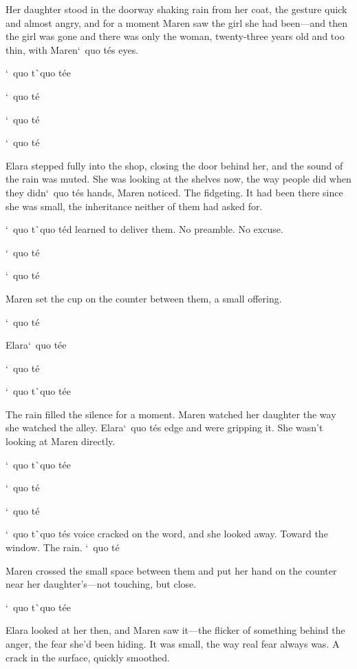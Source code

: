 \documentclass[12pt,letterpaper,openany]{book}
\begin{document}
\par
Her daughter stood in the doorway shaking rain from her coat, the gesture quick and almost angry, and for a moment Maren saw the girl she had been—and then the girl was gone and there was only the woman, twenty-three years old and too thin, with Maren`\ quo t\'e{}s eyes.
\par
`\ quo t\`\ quo t\'e{}e{}
\par
`\ quo t\'e{}
\par
`\ quo t\'e{}
\par
`\ quo t\'e{}
\par
Elara stepped fully into the shop, closing the door behind her, and the sound of the rain was muted. She was looking at the shelves now, the way people did when they didn`\ quo t\'e{}s hands, Maren noticed. The fidgeting. It had been there since she was small, the inheritance neither of them had asked for.
\par
`\ quo t\`\ quo t\'e{}d learned to deliver them. No preamble. No excuse.
\par
`\ quo t\'e{}
\par
`\ quo t\'e{}
\par
Maren set the cup on the counter between them, a small offering.
\par
`\ quo t\'e{}
\par
Elara`\ quo t\'e{}e{}
\par
`\ quo t\'e{}
\par
`\ quo t\`\ quo t\'e{}e{}
\par
The rain filled the silence for a moment. Maren watched her daughter the way she watched the alley. Elara`\ quo t\'e{}s edge and were gripping it. She wasn't looking at Maren directly.
\par
`\ quo t\`\ quo t\'e{}e{}
\par
`\ quo t\'e{}
\par
`\ quo t\'e{}
\par
`\ quo t\`\ quo t\'e{}s voice cracked on the word, and she looked away. Toward the window. The rain. `\ quo t\'e{}
\par
Maren crossed the small space between them and put her hand on the counter near her daughter's—not touching, but close.
\par
`\ quo t\`\ quo t\'e{}e{}
\par
Elara looked at her then, and Maren saw it—the flicker of something behind the anger, the fear she'd been hiding. It was small, the way real fear always was. A crack in the surface, quickly smoothed.
\par
\end{document}
